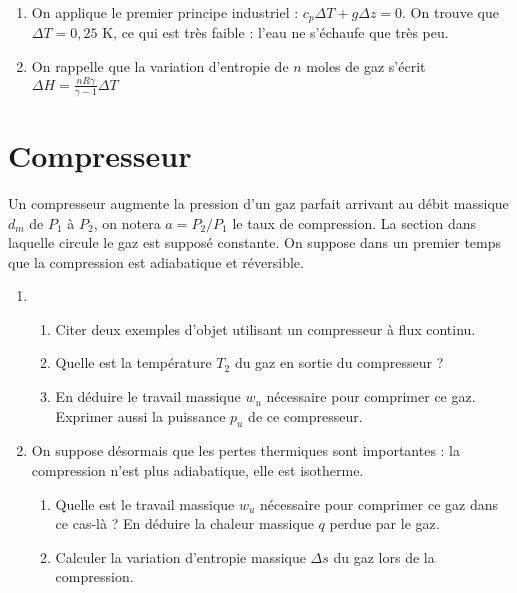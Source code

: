 \begin{correction}

\begin{enumerate}

\item On applique le premier principe industriel : $c_p\Delta T+g\Delta z=0$. On trouve que $\Delta T = 0,25$ K, ce qui est très faible : l'eau ne s'échaufe que très peu.

\item On rappelle que la variation d'entropie de $n$ moles de gaz s'écrit $\Delta H=\frac{nR\gamma}{\gamma-1}\Delta T$

\end{enumerate}

\end{correction}

\newpage

\section{Compresseur}

Un compresseur augmente la pression d'un gaz parfait arrivant au débit massique $d_m$ de $P_1$ à $P_2$, on notera $a=P_2/P_1$ le taux de compression. La section dans laquelle circule le gaz est supposé constante. On suppose dans un premier temps que la compression est adiabatique et réversible.

\begin{enumerate}

\item

\begin{enumerate}

	\item Citer deux exemples d'objet utilisant un compresseur à flux continu.
	
	\item Quelle est la température $T_2$ du gaz en sortie du compresseur ?
	
	\item En déduire le travail massique $w_u$ nécessaire pour comprimer ce gaz. Exprimer aussi la puissance $p_u$ de ce compresseur.

\end{enumerate}

\item

On suppose désormais que les pertes thermiques sont importantes : la compression n'est plus adiabatique, elle est isotherme. 

\begin{enumerate}

	\item Quelle est le travail massique $w_u$ nécessaire pour comprimer ce gaz dans ce cas-là ? En déduire la chaleur massique $q$ perdue par le gaz. 
	
	\item Calculer la variation d'entropie massique $\Delta s$ du gaz lors de la compression.
	
\end{enumerate}

\end{enumerate}

